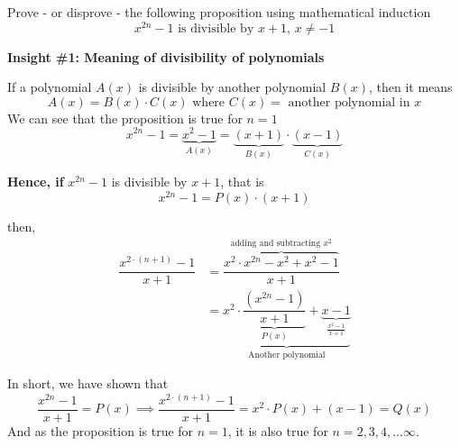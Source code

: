 
\question[4] Prove - or disprove - the following proposition using mathematical induction 
\[ x^{2n} - 1 \text{ is divisible by } x + 1,\, x\neq -1 \]

\insertQR{}

\begin{solution}[\halfpage]
  \textbf{Insight \#1: Meaning of divisibility of polynomials}

  If a polynomial $A(x)$ is divisible by another polynomial $B(x)$, then it means 
  \[ A(x) = B(x)\cdot C(x)\text{ where } C(x) = \text{ another polynomial in }x \] 
  We can see that the proposition is true for $n=1$
  \[ x^{2n} - 1 = \underbrace{x^2 - 1}_{A(x)} = \underbrace{(x+1)}_{B(x)}\cdot\underbrace{(x-1)}_{C(x)} \] 

  \textbf{Hence, if} $x^{2n}-1$ is divisible by $x+1$, that is 
  \[ x^{2n}-1 = P(x)\cdot (x+1) \] 
  
  then, 
  \begin{align}
    \dfrac{x^{2\cdot(n+1)}-1}{x+1} &= \overbrace{\dfrac{x^2\cdot x^{2n} - x^2 + x^2 - 1}{x+1}}^{\text{adding and subtracting $x^2$}} \\
    &= \underbrace{x^2\cdot\underbrace{\dfrac{(x^{2n} - 1)}{x+1}}_{P(x)} + \underbrace{x-1}_{\frac{x^2-1}{x+1}}}_{\text{Another polynomial}}
  \end{align}

  In short, we have shown that 
  \[ \dfrac{x^{2n}-1}{x+1} = P(x)\implies\dfrac{x^{2\cdot(n+1)}-1}{x+1} = x^2\cdot P(x) + (x-1) = Q(x) \]
  And as the proposition is true for $n=1$, it is also true for $n=2,3,4,\ldots\infty$.

\end{solution}
